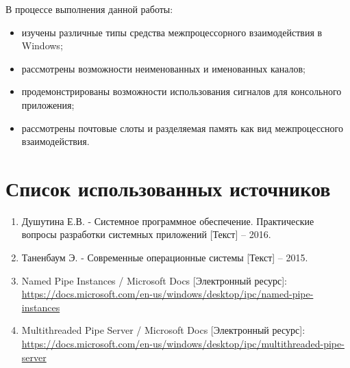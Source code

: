 В процессе выполнения данной работы:

\begin{itemize}
	\item изучены различные типы средства межпроцессорного взаимодействия в Windows;
	\item рассмотрены возможности неименованных и именованных каналов;
	\item продемонстрированы возможности использования сигналов для консольного приложения; 
	\item рассмотрены почтовые слоты и разделяемая память как вид межпроцессного взаимодействия.
\end{itemize}

\section*{Список использованных источников}

\begin{enumerate}
	\item Душутина Е.В. - Системное программное обеспечение. Практические вопросы разработки системных приложений [Текст] -- 2016.
	\item Таненбаум Э. - Современные операционные системы [Текст] -- 2015.
	\item Named Pipe Instances / Microsoft Docs [Электронный ресурс]:\\
		{\small\url{https://docs.microsoft.com/en-us/windows/desktop/ipc/named-pipe-instances}} 
	\item Multithreaded Pipe Server / Microsoft Docs [Электронный ресурс]:\\
		{\small\url{https://docs.microsoft.com/en-us/windows/desktop/ipc/multithreaded-pipe-server}} 
\end{enumerate}


